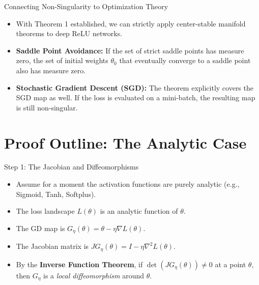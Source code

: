\documentclass[10pt, aspectratio=169]{beamer}
\theoremstyle{definition}
\begin{document}
\begin{frame}{Connecting Non-Singularity to Optimization Theory}
    \begin{itemize}
        \item With Theorem 1 established, we can strictly apply center-stable manifold theorems to deep ReLU networks.
        \item \textbf{Saddle Point Avoidance:} If the set of strict saddle points has measure zero, the set of initial weights $\theta_0$ that eventually converge to a saddle point also has measure zero.
        \item \textbf{Stochastic Gradient Descent (SGD):} The theorem explicitly covers the SGD map as well. If the loss is evaluated on a mini-batch, the resulting map is still non-singular.
    \end{itemize}
\end{frame}

\section{Proof Outline: The Analytic Case}

\begin{frame}{Step 1: The Jacobian and Diffeomorphisms}
    \begin{itemize}
        \item Assume for a moment the activation functions are purely analytic (e.g., Sigmoid, Tanh, Softplus).
        \item The loss landscape $L(\theta)$ is an analytic function of $\theta$.
        \item The GD map is $G_\eta(\theta) = \theta - \eta \nabla L(\theta)$.
        \item The Jacobian matrix is $J G_\eta(\theta) = I - \eta \nabla^2 L(\theta)$.
        \item By the \textbf{Inverse Function Theorem}, if $\det(J G_\eta(\theta)) \neq 0$ at a point $\theta$, then $G_\eta$ is a \textit{local diffeomorphism} around $\theta$.
    \end{itemize}
\end{frame}
\end{document}
